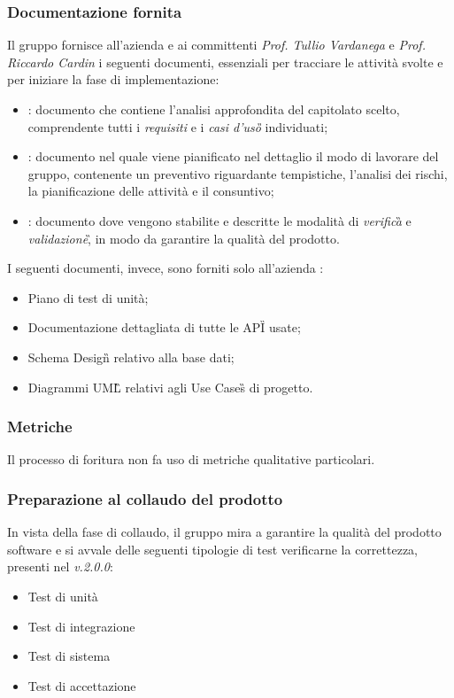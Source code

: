 \subsubsection{Documentazione fornita}
Il gruppo fornisce all'azienda \proponente{} e ai committenti \textit{Prof. Tullio Vardanega} e \textit{Prof. Riccardo Cardin} i seguenti documenti, essenziali per tracciare le attività svolte e per iniziare la fase di implementazione:
\begin{itemize}
	\item \AdR{}: documento che contiene l'analisi approfondita del capitolato scelto, comprendente tutti i \emph{requisiti} e i \emph{casi d'uso\G{}} individuati;
	\item \PdP{}: documento nel quale viene pianificato nel dettaglio il modo di lavorare del gruppo, contenente un preventivo riguardante tempistiche, l'analisi dei rischi, la pianificazione delle attività e il consuntivo;
	\item \PdQ{}: documento dove vengono stabilite e descritte le modalità di \emph{verifica}\G{} e \emph{validazione}\G, in modo da garantire la qualità del prodotto.  
\end{itemize}
I seguenti documenti, invece, sono forniti solo all'azienda \proponente{}:
\begin{itemize}
	\item Piano di test di unità;
	\item Documentazione dettagliata di tutte le API\G{} usate;
	\item Schema Design\G{} relativo alla base dati;
	\item Diagrammi UML\G{} relativi agli Use Cases\G{} di progetto.
\end{itemize}

\subsubsection{Metriche}
Il processo di foritura non fa uso di metriche qualitative particolari.

\subsubsection{Preparazione al collaudo del prodotto}
In vista della fase di collaudo, il gruppo mira a garantire la qualità del prodotto software e si avvale delle seguenti
tipologie di test verificarne la correttezza, presenti nel \PdQ{} \textit{v.2.0.0}:
\begin{itemize}
	\item Test di unità
	\item Test di integrazione
	\item Test di sistema
	\item Test di accettazione
\end{itemize}

